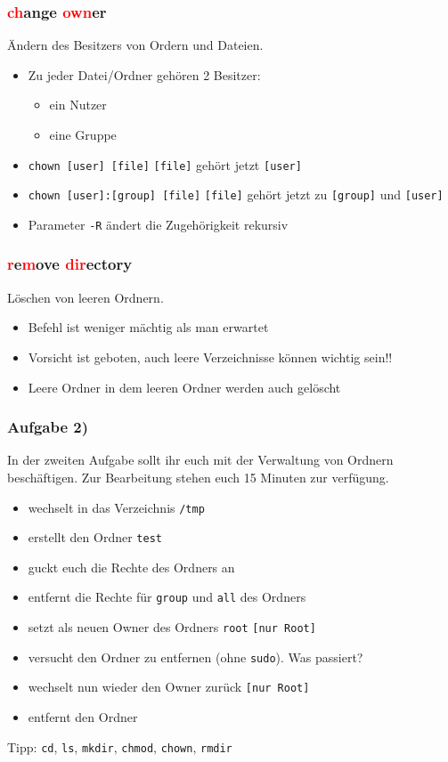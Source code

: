 \documentclass[12pt,utf8]{beamer}
\begin{document}
\begin{frame}
\frametitle{\textcolor{red}{ch}ange \textcolor{red}{own}er}
Ändern des Besitzers von Ordern und Dateien.
\begin{itemize}
	\item Zu jeder Datei/Ordner gehören 2 Besitzer:
	\begin{itemize}[<+->]
		\item ein Nutzer
		\item eine Gruppe
	\end{itemize}
	\item \texttt{chown [user] [file]} \texttt{[file]} gehört jetzt \texttt{[user]}
	\item \texttt{chown [user]:[group] [file]} \texttt{[file]} gehört jetzt zu \texttt{[group]} und \texttt{[user]}
	\item Parameter \texttt{-R} ändert die Zugehörigkeit rekursiv
\end{itemize}
\end{frame}

\begin{frame}
\frametitle{\textcolor{red}{r}e\textcolor{red}{m}ove \textcolor{red}{dir}ectory}
Löschen von leeren Ordnern.
\begin{itemize}
	\item Befehl ist weniger mächtig als man erwartet
	\item Vorsicht ist geboten, auch leere Verzeichnisse können wichtig sein!!
	\item Leere Ordner in dem leeren Ordner werden auch gelöscht
\end{itemize}
\end{frame}

\begin{frame}
\frametitle{Aufgabe 2)}
In der zweiten Aufgabe sollt ihr euch mit der Verwaltung von Ordnern beschäftigen. Zur Bearbeitung stehen euch 15 Minuten zur verfügung.
{\footnotesize
\begin{itemize}
	\item wechselt in das Verzeichnis \texttt{/tmp}
	\item erstellt den Ordner \texttt{test}
	\item guckt euch die Rechte des Ordners an
	\item entfernt die Rechte für \texttt{group} und \texttt{all} des Ordners
	\item setzt als neuen Owner des Ordners \texttt{root} \texttt{[nur Root]}
	\item versucht den Ordner zu entfernen (ohne \texttt{sudo}). Was passiert?
	\item wechselt nun wieder den Owner zurück \texttt{[nur Root]}
	\item entfernt den Ordner
\end{itemize}
}
{\scriptsize Tipp: \texttt{cd}, \texttt{ls}, \texttt{mkdir}, \texttt{chmod}, \texttt{chown}, \texttt{rmdir}}
\end{frame}
\end{document}
